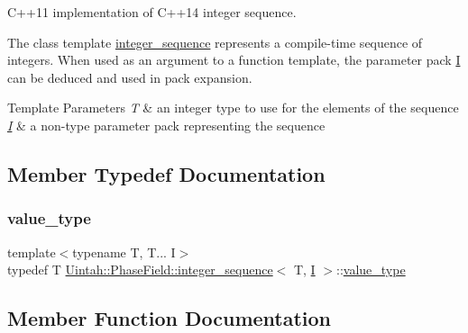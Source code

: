 C++11 implementation of C++14 integer sequence. 

The class template \hyperlink{structUintah_1_1PhaseField_1_1integer__sequence}{integer\+\_\+sequence} represents a compile-\/time sequence of integers. When used as an argument to a function template, the parameter pack \hyperlink{structUintah_1_1PhaseField_1_1I}{I} can be deduced and used in pack expansion.


\begin{DoxyTemplParams}{Template Parameters}
{\em T} & an integer type to use for the elements of the sequence \\
\hline
{\em \hyperlink{structUintah_1_1PhaseField_1_1I}{I}} & a non-\/type parameter pack representing the sequence \\
\hline
\end{DoxyTemplParams}


\subsection{Member Typedef Documentation}
\mbox{\label{structUintah_1_1PhaseField_1_1integer__sequence_a3bd68d516fd31a6433124da9181cf5d7}} 
\subsubsection{\texorpdfstring{value\+\_\+type}{value\_type}}
{\footnotesize\ttfamily template$<$typename T, T... I$>$ \\
typedef T \hyperlink{structUintah_1_1PhaseField_1_1integer__sequence}{Uintah\+::\+Phase\+Field\+::integer\+\_\+sequence}$<$ T, \hyperlink{structUintah_1_1PhaseField_1_1I}{I} $>$\+::\hyperlink{structUintah_1_1PhaseField_1_1integer__sequence_a3bd68d516fd31a6433124da9181cf5d7}{value\+\_\+type}}



\subsection{Member Function Documentation}
\mbox{\label{structUintah_1_1PhaseField_1_1integer__sequence_af392cbbe56b45f3e350d9d3e46f9fcdc}} 
